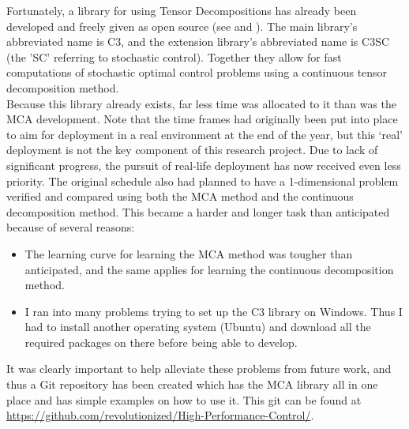 \documentclass[11pt,draftd]{article}
\begin{document}
\noindent Fortunately, a library for using Tensor Decompositions has already been developed and freely given as open source (see \cite{c3c} and \cite{c3cs}). The main library's abbreviated name is C3, and the extension library’s abbreviated name is C3SC (the 'SC' referring to stochastic control). Together they allow for fast computations of stochastic optimal control problems using a continuous tensor decomposition method. \\

\noindent Because this library already exists, far less time was allocated to it than was the MCA development. Note that the time frames had originally been put into place to aim for deployment in a real environment at the end of the year, but this ‘real’ deployment is not the key component of this research project. Due to lack of significant progress, the pursuit of real-life deployment has now received even less priority. The original schedule also had planned to have a 1-dimensional problem verified and compared using both the MCA method and the continuous decomposition method. This became a harder and longer task than anticipated because of several reasons: \\
\begin{itemize}
	\item The learning curve for learning the MCA method was tougher than anticipated, and the same applies for learning the continuous decomposition method.
	\item I ran into many problems trying to set up the C3 library on Windows. Thus I had to install another operating system (Ubuntu) and download all the required packages on there before being able to develop. \\
\end{itemize}
It was clearly important to help alleviate these problems from future work, and thus a Git repository has been created which has the MCA library all in one place and has simple examples on how to use it. This git can be found at \url{https://github.com/revolutionized/High-Performance-Control/}. \\
\end{document}
